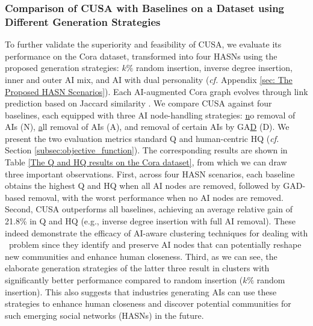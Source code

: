 \subsubsection{Comparison of CUSA with Baselines on a Dataset using Different Generation Strategies} To further validate the superiority and feasibility of CUSA, we evaluate its performance on the Cora dataset, transformed into four HASNs using the proposed generation strategies: $k\%$ random insertion, inverse degree insertion, inner and outer AI mix, and AI with dual personality (\textit{cf.} Appendix \ref{sec: The Proposed HASN Scenarios}). Each AI-augmented Cora graph evolves through link prediction based on Jaccard similarity \cite{arrar2024comprehensive}\cite{daud2020applications}. We compare CUSA against four baselines, each equipped with three AI node-handling strategies: \underline{n}o removal of AIs (N), \underline{a}ll removal of AIs (A), and removal of certain AIs by GA\underline{D} (D). We present the two evaluation metrics standard Q and human-centric HQ (\textit{cf.} Section \ref{subsec:objective_function}). The corresponding results are shown in Table \ref{The Q and HQ results on the Cora dataset}, from which we can draw three important observations. First, across four HASN scenarios, each baseline obtains the highest Q and HQ when all AI nodes are removed, followed by GAD-based removal, with the worst performance when no AI nodes are removed. Second, CUSA outperforms all baselines, achieving an average relative gain of 21.8\% in Q and HQ (e.g., inverse degree insertion with full AI removal). These indeed demonstrate the efficacy of AI-aware clustering techniques for dealing with \problem\ problem since they identify and preserve AI nodes that can potentially reshape new communities and enhance human closeness. Third, as we can see, the elaborate generation strategies of the latter three result in clusters with significantly better performance compared to random insertion ($k\%$ random insertion). This also suggests that industries generating AIs can use these strategies to enhance human closeness and discover potential communities for such emerging social networks (HASNs) in the future.






















